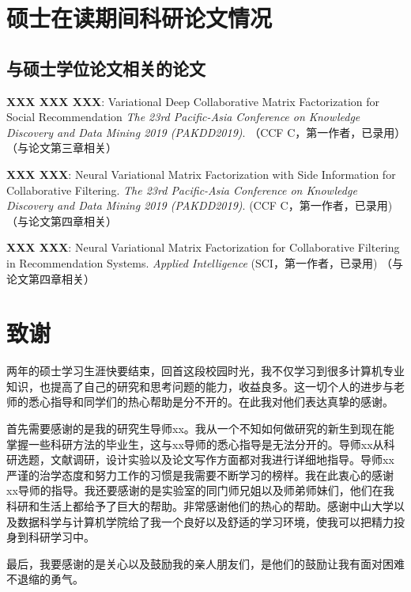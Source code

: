 \chapter{硕士在读期间科研论文情况}

\section*{与硕士学位论文相关的论文}
\newcommand{\journal}[1]{\emph{#1}} 
\newcommand{\conference}[1]{\emph{#1}} 

\begin{itemize*}
\item
\textbf{XXX XXX XXX}:
\newblock  Variational Deep Collaborative Matrix Factorization for Social Recommendation
\newblock\conference{The 23rd Pacific-Asia Conference on Knowledge Discovery and Data Mining 2019 (PAKDD2019)}. （CCF C，第一作者，已录用）（与论文第三章相关）
\item
\textbf{XXX XXX}:
\newblock  Neural Variational Matrix Factorization with Side Information for Collaborative Filtering.
\newblock\conference{The 23rd Pacific-Asia Conference on Knowledge Discovery and Data Mining 2019 (PAKDD2019)}. (CCF C，第一作者，已录用)（与论文第四章相关）
\item
\textbf{XXX XXX}:
\newblock  Neural Variational Matrix Factorization for Collaborative Filtering in Recommendation Systems.
\newblock\conference{Applied Intelligence} (SCI，第一作者，已录用) （与论文第四章相关）
\end{itemize*}




\chapter{致谢}
%
两年的硕士学习生涯快要结束，回首这段校园时光，我不仅学习到很多计算机专业知识，也提高了自己的研究和思考问题的能力，收益良多。这一切个人的进步与老师的悉心指导和同学们的热心帮助是分不开的。在此我对他们表达真挚的感谢。
%

首先需要感谢的是我的研究生导师xx。我从一个不知如何做研究的新生到现在能掌握一些科研方法的毕业生，这与xx导师的悉心指导是无法分开的。导师xx从科研选题，文献调研，设计实验以及论文写作方面都对我进行详细地指导。导师xx严谨的治学态度和努力工作的习惯是我需要不断学习的榜样。我在此衷心的感谢xx导师的指导。我还要感谢的是实验室的同门师兄姐以及师弟师妹们，他们在我科研和生活上都给予了巨大的帮助。非常感谢他们的热心的帮助。感谢中山大学以及数据科学与计算机学院给了我一个良好以及舒适的学习环境，使我可以把精力投身到科研学习中。
%

最后，我要感谢的是关心以及鼓励我的亲人朋友们，是他们的鼓励让我有面对困难不退缩的勇气。\nopagebreak
%

